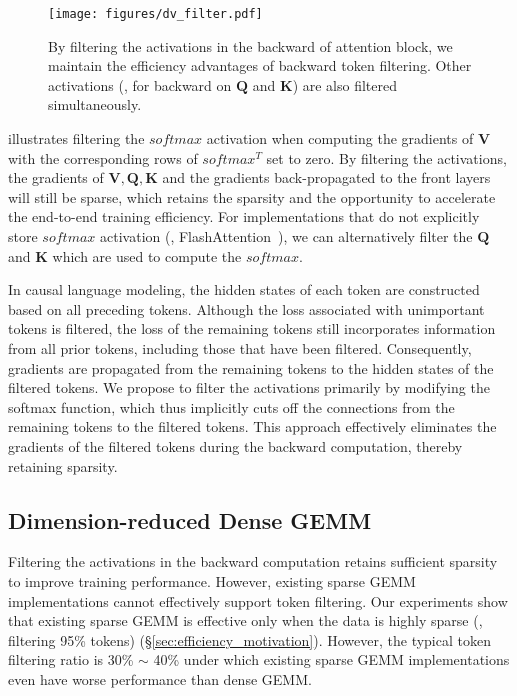 \begin{figure}[t]
	\centering
	\texttt{[image: figures/dv\_filter.pdf]}
	\caption{By filtering the activations in the backward of attention block, we maintain the efficiency advantages of backward token filtering. Other activations (\eg, for backward on $\mathbf{Q}$ and $\mathbf{K}$) are also filtered simultaneously.} %
	\label{fig:dv_filter}
\end{figure}
 illustrates filtering the $softmax$ activation when computing the gradients of $\mathbf{V}$ with the corresponding rows of $softmax^T$ set to zero. By filtering the activations, the gradients of $\mathbf{V,Q,K}$ and the gradients back-propagated to the front layers will still be sparse, which retains the sparsity and the opportunity to accelerate the end-to-end training efficiency. For implementations that do not explicitly store $softmax$ activation (\eg, FlashAttention~\cite{FlashAttention}), we can alternatively filter the $\mathbf{Q}$ and $\mathbf{K}$ which are used to compute the $softmax$. 

In causal language modeling, the hidden states of each token are constructed based on all preceding tokens. Although the loss associated with unimportant tokens is filtered, the loss of the remaining tokens still incorporates information from all prior tokens, including those that have been filtered. Consequently, gradients are propagated from the remaining tokens to the hidden states of the filtered tokens. We propose to filter the activations primarily by modifying the softmax function, which thus implicitly cuts off the connections from the remaining tokens to the filtered tokens. This approach effectively eliminates the gradients of the filtered tokens during the backward computation, thereby retaining sparsity.

\subsection{Dimension-reduced Dense GEMM}\label{sec:system:accelerate_sparse_gemm}

Filtering the activations in the backward computation retains sufficient sparsity to improve training performance. However, existing sparse GEMM implementations cannot effectively support token filtering. Our experiments show that existing sparse GEMM is effective only when the data is highly sparse (\eg, filtering 95\% tokens) (\S\ref{sec:efficiency_motivation}). However, the typical token filtering ratio is 30\% $\sim$ 40\% under which existing sparse GEMM implementations even have worse performance than dense GEMM. 

